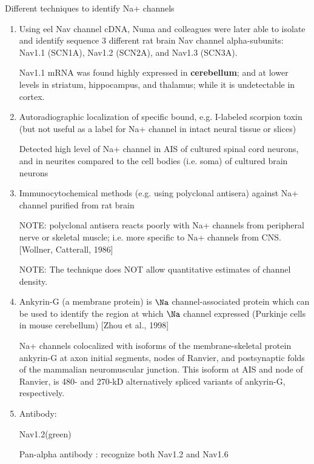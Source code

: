 Different techniques to identify Na+ channels
\begin{enumerate}

  \item Using eel Nav channel cDNA, Numa and colleagues were later able to
isolate and identify sequence 3 different rat brain Nav channel
alpha-subunits: Nav1.1 (SCN1A), Nav1.2 (SCN2A), and Nav1.3 (SCN3A).

Nav1.1 mRNA was found highly expressed in {\bf cerebellum}; and at lower levels
in striatum, hippocampus, and thalamus; while it is undetectable in cortex.
  
  \item Autoradiographic localization of specific bound, e.g. I-labeled scorpion
  toxin (but not useful as a label for Na+ channel in intact neural tissue or
  slices)
  
  Detected high level of Na+ channel in AIS of cultured spinal cord neurons, and
  in neurites compared to the cell bodies (i.e. soma) of cultured brain neurons
  
  
  \item Immunocytochemical methods (e.g. using polyclonal antisera) against Na+
  channel purified from rat brain
  
  NOTE: polyclonal antisera reacts poorly with Na+ channels from peripheral
  nerve or skeletal muscle; i.e. more specific to Na+ channels from CNS.
  [Wollner, Catterall, 1986]
  
  NOTE: The technique does NOT allow quantitative estimates of channel density.
  
  \item Ankyrin-G (a membrane protein) is $\Na$ channel-associated protein which
  can be used to identify the region at which $\Na$ channel expressed
  (Purkinje cells in mouse cerebellum) [Zhou et al., 1998]
  
  Na+ channels colocalized with isoforms of the membrane-skeletal protein
  ankyrin-G at axon initial segments, nodes of Ranvier, and postsynaptic folds
  of the mammalian neuromuscular junction.
  This isoform at AIS and node of Ranvier, is 480- and 270-kD alternatively
  spliced variants of ankyrin-G, respectively.
  
   \item Antibody:
   
   Nav1.2(green)
   
   Pan-alpha antibody : recognize both Nav1.2 and Nav1.6
   
    
\end{enumerate}


